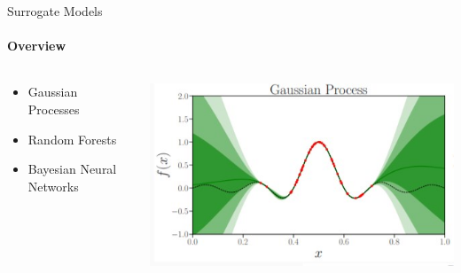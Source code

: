 \begin{frame}[c]{Surrogate Models}
\framesubtitle{Overview}

\begin{columns}[T] %
\begin{column}{.38\textwidth}
\begin{minipage}[c][.6\textheight][c]{\linewidth}
\begin{itemize}
	\item Gaussian Processes 
	\item Random Forests 
	\item Bayesian Neural Networks 

\end{itemize}
\end{minipage}
\end{column}%

\hfill%

\begin{column}{.58\textwidth}

\begin{columns}[T] %
\begin{column}{.48\textwidth}
    \includegraphics[width=1.\textwidth]{images/surrogate_models/uncertainty_gp.jpg}
\end{column}%

\hfill%


\end{columns}
\end{column}
\end{columns}
\end{frame}
